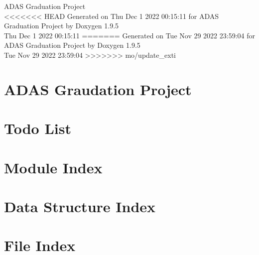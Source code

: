 \documentclass[twoside]{book}
\newcommand{\+}{\discretionary{\mbox{\scriptsize$\hookleftarrow$}}{}{}}
\newcommand{\clearemptydoublepage}{%
    \newpage{\pagestyle{empty}\cleardoublepage}%
  }
\begin{document}
  \raggedbottom
    \hypersetup{pageanchor=false,
                bookmarksnumbered=true,
                pdfencoding=unicode
               }
  \begin{titlepage}
  \vspace*{7cm}
  \begin{center}%
  {\Large ADAS Graduation Project}\\
  \vspace*{1cm}
<<<<<<< HEAD
  {\large Generated on Thu Dec 1 2022 00\+:15\+:11 for ADAS Graduation Project by Doxygen 1.9.5}\\
    \vspace*{0.5cm}
    {\small Thu Dec 1 2022 00:15:11}
=======
  {\large Generated on Tue Nov 29 2022 23\+:59\+:04 for ADAS Graduation Project by Doxygen 1.9.5}\\
    \vspace*{0.5cm}
    {\small Tue Nov 29 2022 23:59:04}
>>>>>>> mo/update_exti
  \end{center}
  \end{titlepage}
  \clearemptydoublepage
  \tableofcontents
  \clearemptydoublepage
  \hypersetup{pageanchor=true}
\chapter{ADAS Graudation Project}
\label{index}\hypertarget{index}{}
\chapter{Todo List}
\label{todo}

\chapter{Module Index}

\chapter{Data Structure Index}

\chapter{File Index}

\end{document}
